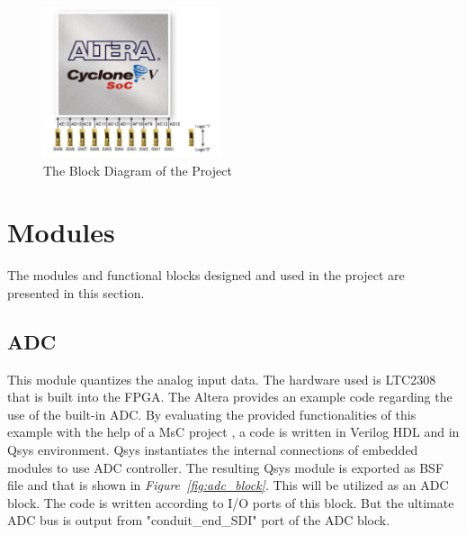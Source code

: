 \documentclass[paper]{IEEEtran}
\begin{document}
\begin{figure}[h!]
	\setlength{\unitlength}{\textwidth}
	\center 
	\includegraphics[width=0.47\textwidth]{switch_buttons}
	\caption{\label{fig:switch_buttons}The Block Diagram of the Project}
\end{figure}





\section{Modules}
The modules and functional blocks designed and used in the project are presented in this section.

\subsection{ADC} \- \indent
		This module quantizes the analog input data. The hardware used is LTC2308 that is built into the FPGA. The Altera provides an example code regarding the use of the built-in ADC\cite{b1}. By evaluating the provided functionalities of this example with the help of a MsC project \cite{b2}, a code is written in Verilog HDL and in Qsys environment. Qsys instantiates the internal connections of embedded modules to use ADC controller. The resulting Qsys module is exported as BSF file and that is shown in \textit{Figure~\ref{fig:adc_block}}. This will be utilized as an ADC block. The code is written according to I/O ports of this block. But the ultimate ADC bus is output from "conduit\_end\_SDI" port of the ADC block. 
		
\end{document}
